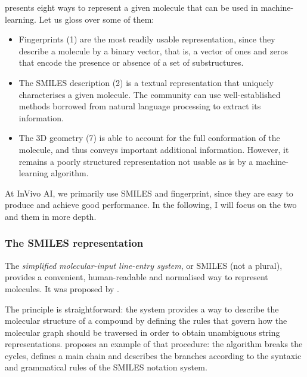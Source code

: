 \documentclass[11pt]{article}
\numberwithin{equation}{subsection}
\begin{document}
 presents eight ways to represent a given molecule that can be used in machine-learning. Let us gloss over some of them:
\begin{itemize}
  \item Fingerprints (1) are the most readily usable representation, since they describe a molecule by a binary vector, that is, a vector of ones and zeros that encode the presence or absence of a set of substructures.
  \item The SMILES description (2) is a textual representation that uniquely characterises a given molecule. The community can use well-established methods borrowed from natural language processing to extract its information.
  \item The 3D geometry (7) is able to account for the full conformation of the molecule, and thus conveys important additional information. However, it remains a poorly structured representation not usable as is by a machine-learning algorithm.
\end{itemize}



At InVivo AI, we primarily use SMILES and fingerprint, since they are easy to produce and achieve good performance. In the following, I will focus on the two and them in more depth.


\subsubsection{The SMILES representation}

The \textit{simplified molecular-input line-entry system}, or SMILES (not a plural), provides a convenient, human-readable and normalised way to represent molecules. It was proposed by \citet{smiles}.

The principle is straightforward: the system provides a way to describe the molecular structure of a compound by defining the rules that govern how the molecular graph should be traversed in order to obtain unambiguous string representations.  proposes an example of that procedure: the algorithm breaks the cycles, defines a main chain and describes the branches according to the syntaxic and grammatical rules of the SMILES notation system.
\end{document}
